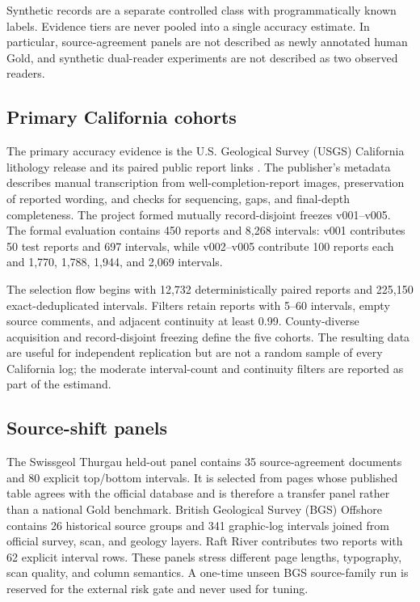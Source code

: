 \documentclass[a4paper,fleqn]{cas-sc}
\begin{document}
Synthetic records are a separate controlled class with programmatically known labels. Evidence tiers are never pooled into a single accuracy estimate. In particular, source-agreement panels are not described as newly annotated human Gold, and synthetic dual-reader experiments are not described as two observed readers.

\subsection{Primary California cohorts}

The primary accuracy evidence is the U.S. Geological Survey (USGS) California lithology release and its paired public report links \citep{haugen2025californialithology, borkovich2025californiawcr}. The publisher's metadata describes manual transcription from well-completion-report images, preservation of reported wording, and checks for sequencing, gaps, and final-depth completeness. The project formed mutually record-disjoint freezes v001--v005. The formal evaluation contains 450 reports and 8,268 intervals: v001 contributes 50 test reports and 697 intervals, while v002--v005 contribute 100 reports each and 1,770, 1,788, 1,944, and 2,069 intervals.

The selection flow begins with 12,732 deterministically paired reports and 225,150 exact-deduplicated intervals. Filters retain reports with 5--60 intervals, empty source comments, and adjacent continuity at least 0.99. County-diverse acquisition and record-disjoint freezing define the five cohorts. The resulting data are useful for independent replication but are not a random sample of every California log; the moderate interval-count and continuity filters are reported as part of the estimand.

\subsection{Source-shift panels}

The Swissgeol Thurgau held-out panel contains 35 source-agreement documents and 80 explicit top/bottom intervals. It is selected from pages whose published table agrees with the official database and is therefore a transfer panel rather than a national Gold benchmark. British Geological Survey (BGS) Offshore contains 26 historical source groups and 341 graphic-log intervals joined from official survey, scan, and geology layers. Raft River contributes two reports with 62 explicit interval rows. These panels stress different page lengths, typography, scan quality, and column semantics. A one-time unseen BGS source-family run is reserved for the external risk gate and never used for tuning.
\end{document}
